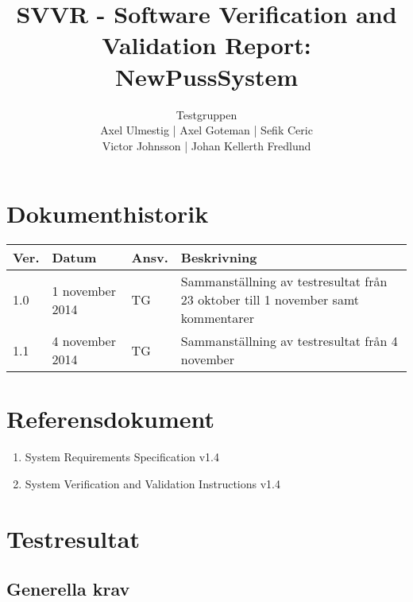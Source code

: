 \documentclass[a4paper]{article}
\title{SVVR - Software Verification and Validation Report: NewPussSystem}
\author{Testgruppen \\ Axel Ulmestig | Axel Goteman | Sefik Ceric \\ Victor Johnsson | Johan Kellerth Fredlund}
\date{}
\begin{document}
\maketitle
\thispagestyle{fancy}
\tableofcontents
\newpage

\section*{Dokumenthistorik}

\begin{tabular}{ l l l p{9cm} }
Ver. & Datum & Ansv. & Beskrivning \\\hline
1.0 & 1 november 2014 & TG & Sammanställning av testresultat från 23 oktober till 1 november samt kommentarer \\
1.1 & 4 november 2014 & TG & Sammanställning av testresultat från 4 november\\

\end{tabular}
     

\section{Referensdokument}
\begin{enumerate}
\item System Requirements Specification v1.4
\item System Verification and Validation Instructions v1.4
\end{enumerate}



\section{Testresultat}


\subsection{Generella krav}
\end{document}
